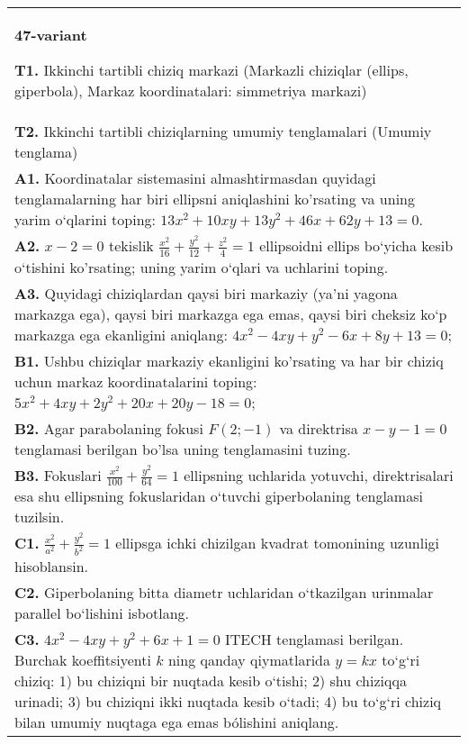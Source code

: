 \documentclass{article}
\begin{document}
\begin{tabular}{m{17cm}}
\textbf{47-variant}
\newline

\textbf{T1.} Ikkinchi tartibli chiziq markazi (Markazli chiziqlar (ellips, giperbola), Markaz koordinatalari: simmetriya markazi) \\
\textbf{T2.} Ikkinchi tartibli chiziqlarning umumiy tenglamalari (Umumiy tenglama) \\
\textbf{A1.} Koordinatalar sistemasini almashtirmasdan quyidagi tenglamalarning har biri ellipsni aniqlashini ko'rsating va uning yarim o‘qlarini toping: $13 x^2+10 x y+13 y^2+46 x+62 y+13=0$. \\
\textbf{A2.} $x-2=0$ tekislik $\frac{x^2}{16}+\frac{y^2}{12}+\frac{z^2}{4}=1$ ellipsoidni ellips bo‘yicha kesib o‘tishini ko'rsating; uning yarim o‘qlari va uchlarini toping. \\
\textbf{A3.} Quyidagi chiziqlardan qaysi biri markaziy (ya’ni yagona markazga ega), qaysi biri markazga ega emas, qaysi biri cheksiz ko‘p markazga ega ekanligini aniqlang: $4 x^2-4 x y+y^2-6 x+8 y+13=0$; \\
\textbf{B1.} Ushbu chiziqlar markaziy ekanligini ko'rsating va har bir chiziq uchun markaz koordinatalarini toping: $5 x^2+4 x y+2 y^2+20 x+20 y-18=0$; \\
\textbf{B2.} Agar parabolaning fokusi $F(2;-1) $ va direktrisa $x-y-1=0$ tenglamasi berilgan bo'lsa uning tenglamasini tuzing. \\
\textbf{B3.} Fokuslari $\frac{x^2}{100}+\frac{y^2}{64}=1$ ellipsning uchlarida yotuvchi, direktrisalari esa shu ellipsning fokuslaridan o‘tuvchi giperbolaning tenglamasi tuzilsin. \\
\textbf{C1.} $\frac{x^2}{a^2}+\frac{y^2}{b^2}=1$ ellipsga ichki chizilgan kvadrat tomonining uzunligi hisoblansin. \\
\textbf{C2.} Giperbolaning bitta diametr uchlaridan o‘tkazilgan urinmalar parallel bo‘lishini isbotlang. \\
\textbf{C3.} $4 x^2-4 x y+y^2+6 x+1=0$ ITECH tenglamasi berilgan. Burchak koeffitsiyenti $k$ ning qanday qiymatlarida $y=kx$ to‘g‘ri chiziq: 1) bu chiziqni bir nuqtada kesib o‘tishi; 2) shu chiziqqa urinadi; 3) bu chiziqni ikki nuqtada kesib o‘tadi; 4) bu to‘g‘ri chiziq bilan umumiy nuqtaga ega emas bólishini aniqlang. \\

\end{tabular}
\vspace{1cm}
\end{document}
